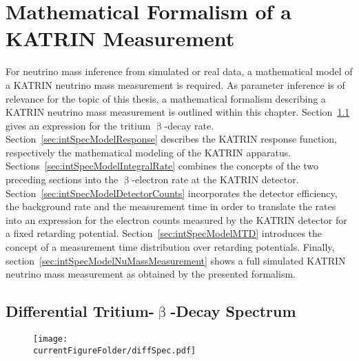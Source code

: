 \def\currentRootFolder{chapter/modelOfIntegratedRate}
\def\currentFigureFolder{\currentRootFolder/fig}



\chapter{Mathematical Formalism of a KATRIN Measurement}
\label{sec:intSpecModel}
For neutrino mass inference from simulated or real data, a mathematical model of a KATRIN neutrino mass measurement is required. As parameter inference is of relevance for the topic of this thesis, a mathematical formalism describing a KATRIN neutrino mass measurement is outlined within this chapter. Section~\ref{sec:intSpecModelDiffSpec} gives an expression for the tritium $\upbeta$-decay rate. Section~\ref{sec:intSpecModelResponse} describes the KATRIN response function, respectively the mathematical modeling of the KATRIN apparatus. Sections~\ref{sec:intSpecModelIntegralRate} combines the concepts of the two preceding sections into the $\upbeta$-electron rate at the KATRIN detector. Section~\ref{sec:intSpecModelDetectorCounts} incorporates the detector efficiency, the background rate and the measurement time in order to translate the rates into an expression for the electron counts measured by the KATRIN detector for a fixed retarding potential. Section~\ref{sec:intSpecModelMTD} introduces the concept of a measurement time distribution over retarding potentials. Finally, section~\ref{sec:intSpecModelNuMassMeasurement} shows a full simulated KATRIN neutrino mass measurement as obtained by the presented formalism.

\section{Differential Tritium-\texorpdfstring{$\upbeta$}{Beta}-Decay Spectrum}
\label{sec:intSpecModelDiffSpec}
\begin{figure}
	\centering
	\texttt{[image: \\currentFigureFolder/diffSpec.pdf]}
	\label{fig:intSpecModelDiffSpec}
\end{figure}


